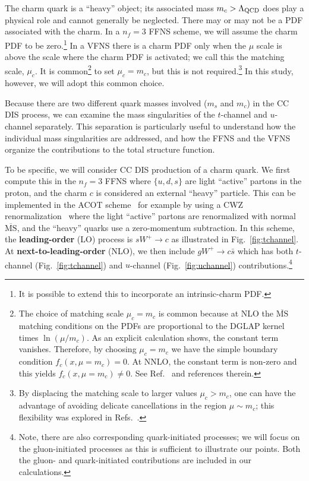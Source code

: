 The charm quark is a ``heavy'' object; its associated mass
$m_{c}> \Lambda_{\rm QCD}$ does play a physical role and cannot
generally be neglected. There may or may not be a PDF associated with
the charm. In a $n_f=3$ FFNS scheme, we will assume the charm PDF to
be zero.\footnote{It is possible to extend this to incorporate an
  intrinsic-charm PDF.} In a VFNS there is a charm PDF only when the
$\mu$ scale is above the scale where the charm PDF is activated; we
call this the matching scale, $\mu_{c}$.  It is common\footnote{The
  choice of matching scale $\mu_{c}=m_{c}$ is common because at NLO
  the $\overline{\mbox{MS}}$ matching conditions on the PDFs are
  proportional to the DGLAP kernel times $\ln(\mu/m_{c})$. As an
  explicit calculation shows, the constant term vanishes. Therefore,
  by choosing $\mu_{c}=m_{c}$ we have the simple boundary condition
  $f_{c}(x,\mu=m_{c})=0$. At NNLO, the constant term is non-zero and
  this yields $f_{c}(x,\mu=m_{c})\not=0$. See
  Ref.~\cite{Stavreva:2012bs} and references therein.}
%
to set $\mu_{c}=m_{c}$, but this is not required.\footnote{By
  displacing the matching scale to larger values $\mu_{c} > m_{c}$,
  one can have the advantage of avoiding delicate cancellations in the
  region $\mu\sim m_{c}$; this flexibility was explored in
  Refs.~\cite{Bertone:2017ehk,Bertone:2018ids}.}
%
In this study, however, we will adopt this common choice.

Because there are two different quark masses involved ($m_{s}$ and
$m_{c}$) in the CC DIS process, we can examine the mass singularities
of the $t$-channel and $u$-channel separately.
%
This separation is particularly useful to understand how the
individual mass singularities are addressed, and how the FFNS and the
VFNS organize the contributions to the total structure function.

%
To be specific, we will consider CC DIS production of a charm
quark. We first compute this in the $n_f=3$ FFNS where $\{u,d,s\}$ are
light ``active'' partons in the proton, and the charm $c$ is
considered an external ``heavy'' particle. This can be implemented in
the ACOT scheme~\cite{Aivazis:1993pi} for example by using a CWZ
renormalization~\cite{Collins:1978wz} where the light ``active''
partons are renormalized with normal $\overline{\mbox{MS}}$, and the
``heavy'' quarks use a zero-momentum subtraction. In this scheme, the
\textbf{leading-order} (LO) process is \mbox{$sW^{+}\to c$} as
illustrated in Fig.~\ref{fig:tchannel}. At \textbf{next-to-leading-order}
(NLO), we then include \mbox{$gW^{+}\to c\bar{s}$} which has both
$t$-channel (Fig.~\ref{fig:tchannel}) and $u$-channel  (Fig.~\ref{fig:uchannel}) contributions.\footnote{Note, there are
  also corresponding quark-initiated processes; we will focus on the
  gluon-initiated processes as this is sufficient to illustrate our
  points. Both the gluon- and quark-initiated contributions are
  included in our calculations.}

